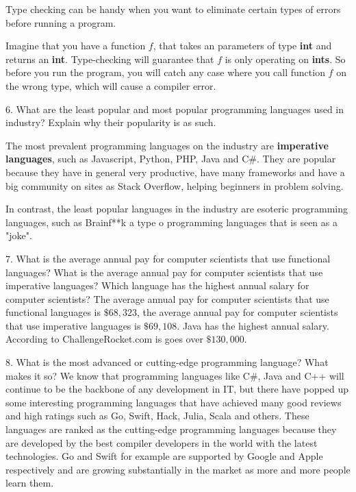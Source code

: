 \documentclass{article}
\begin{document}
Type checking can be handy when you want to eliminate certain types of errors before running a program. 

Imagine that you have a function $f$, that takes an parameters of type \textbf{int} and returns an \textbf{int}. Type-checking will guarantee that $f$ is only operating on \textbf{ints}. So before you run the program, you will catch any case where you call function $f$ on the wrong type, which will cause a compiler error.
\newline

\newpage

6. What are the least popular and most popular programming languages used in industry? Explain why their popularity is as such.
\newline

The most prevalent programming languages on the industry are \textbf{imperative languages}, such as Javascript, Python, PHP, Java and C\#. They are popular because they have in general very productive, have many frameworks and have a big community on sites as Stack Overflow, helping beginners in problem solving.
  
In contrast, the least popular languages in the industry are esoteric programming languages, such as Brainf**k a type o programming languages that is seen as a "joke".
\newline

7. What is the average annual pay for computer scientists that use functional languages? What is the average annual pay for computer scientists that use imperative languages? Which language has the highest annual salary for computer scientists?
\newline
The average annual pay for computer scientists that use functional languages is $\$68,323$, the average annual pay for computer scientists that use imperative languages is $\$69,108$. Java has the highest annual salary. According to ChallengeRocket.com is goes over $\$130,000$.
\newline

8. What is the most advanced or cutting-edge programming language? What makes it so?
\newline
We know that programming languages like C\#, Java and C++ will continue to be the backbone of any development in IT, but there have popped up some interesting programming languages that have achieved many good reviews and high ratings such as Go, Swift, Hack, Julia, Scala and others. These languages are ranked as the cutting-edge programming languages because they are developed by the best compiler developers in the world with the latest technologies. Go and Swift for example are supported by Google and Apple respectively and are growing substantially in the market as more and more people learn them.
\newline
\end{document}
